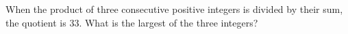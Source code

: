 When the product of three consecutive positive integers is divided by their sum, the quotient is $33$. What is the largest of the three integers?
